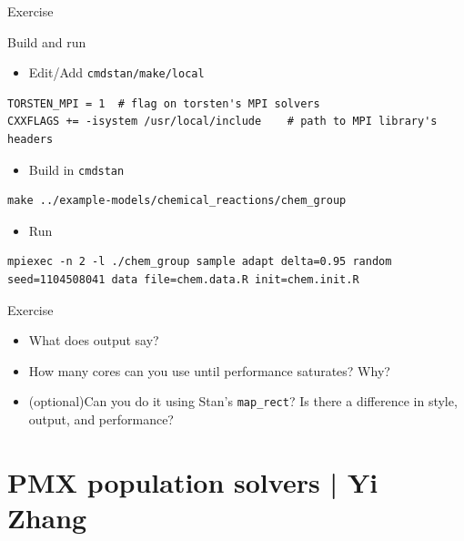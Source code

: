 \documentclass[presentation, allowframebreaks]{beamer}
\begin{document}
\begin{frame}[fragile,label={sec:org5e0bc9e}]{Exercise}
 \begin{block}{Build and run}
\begin{itemize}
\item Edit/Add \texttt{cmdstan/make/local}
\end{itemize}
\begin{verbatim}
TORSTEN_MPI = 1  # flag on torsten's MPI solvers
CXXFLAGS += -isystem /usr/local/include    # path to MPI library's headers
\end{verbatim}
\begin{itemize}
\item Build in \texttt{cmdstan}
\end{itemize}
\begin{verbatim}
make ../example-models/chemical_reactions/chem_group
\end{verbatim}
\begin{itemize}
\item Run
\end{itemize}
\begin{verbatim}
mpiexec -n 2 -l ./chem_group sample adapt delta=0.95 random seed=1104508041 data file=chem.data.R init=chem.init.R
\end{verbatim}
\end{block}
\end{frame}

\begin{frame}[fragile,label={sec:orgdf22c71}]{Exercise}
 \begin{itemize}
\item What does output say?
\item How many cores can you use until performance saturates? Why?
\item (optional)Can you do it using Stan's \texttt{map\_rect}? Is there a difference in style, output, and performance?
\end{itemize}
\end{frame}

\section{PMX population solvers | \footnotesize{Yi Zhang}}
\label{sec:org5b1396a}
\end{document}
